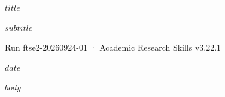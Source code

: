 \documentclass[12pt,a4paper]{article}
\begin{document}
\begin{titlepage}\centering\vspace*{5cm}
{\LARGE\bfseries $title$\par}\vspace{1em}
{\large $subtitle$\par}\vspace{2em}
{Run ftse2-20260924-01 · Academic Research Skills v3.22.1\par}\vspace{1em}
{$date$\par}
\end{titlepage}
\tableofcontents\newpage
\small
$body$
\end{document}
